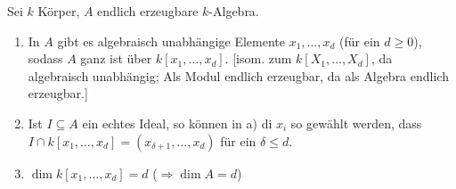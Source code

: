 \begin{Satz}
\label{11}
Sei $k$ K\"orper, $A$ endlich erzeugbare $k$-Algebra.
\begin{enumerate}
\item In $A$ gibt es algebraisch unabh\"angige Elemente $x_1, \ldots, x_d$ (f\"ur ein
$d\geq 0$), sodass $A$ ganz ist \"uber $k[x_1, \ldots, x_d]$. [isom. zum 
$k[X_1,\ldots,X_d]$, da algebraisch unabh\"angig; Als Modul endlich erzeugbar,
da als Algebra endlich erzeugbar.]
\item Ist $I\subseteq A$ ein echtes Ideal, so k\"onnen in a) di $x_i$ so
gew\"ahlt werden, dass $I\cap k[x_1, \ldots, x_d]=(x_{\delta+1},\ldots,x_d)$ f\"ur ein
$\delta \leq d$.
\item $\dim{k[x_1,\ldots,x_d]}=d$ ($\Rightarrow \dim{A} = d$)
\end{enumerate}
\end{Satz}

